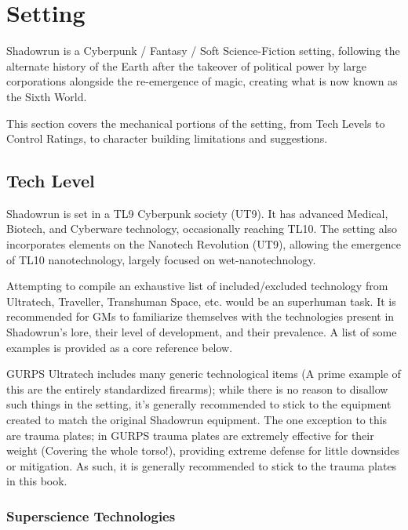 \section{Setting}

\begin{multicols*}{3}
	
	Shadowrun is a Cyberpunk / Fantasy / Soft Science-Fiction setting, following the alternate history of the Earth after the takeover of political power by large corporations alongside the re-emergence of magic, creating what is now known as the Sixth World.
	
	This section covers the mechanical portions of the setting, from Tech Levels to Control Ratings, to character building limitations and suggestions.
	
	\subsection{Tech Level}\label{TL}
	
	Shadowrun is set in a TL9 Cyberpunk society (UT9). It has advanced Medical, Biotech, and Cyberware technology, occasionally reaching TL10. The setting also incorporates elements on the Nanotech Revolution (UT9), allowing the emergence of TL10 nanotechnology, largely focused on wet-nanotechnology.
	
	Attempting to compile an exhaustive list of included/excluded technology from Ultratech, Traveller, Transhuman Space, etc. would be an superhuman task. It is recommended for GMs to familiarize themselves with the technologies present in Shadowrun's lore, their level of development, and their prevalence. A list of some examples is provided as a core reference below.
	
	GURPS Ultratech includes many generic technological items (A prime example of this are the entirely standardized firearms); while there is no reason to disallow such things in the setting, it's generally recommended to stick to the equipment created to match the original Shadowrun equipment. The one exception to this are trauma plates; in GURPS trauma plates are extremely effective for their weight (Covering the whole torso!), providing extreme defense for little downsides or mitigation. As such, it is generally recommended to stick to the trauma plates in this book.
	
	\subsubsection{Superscience Technologies}
	

\end{multicols*}

